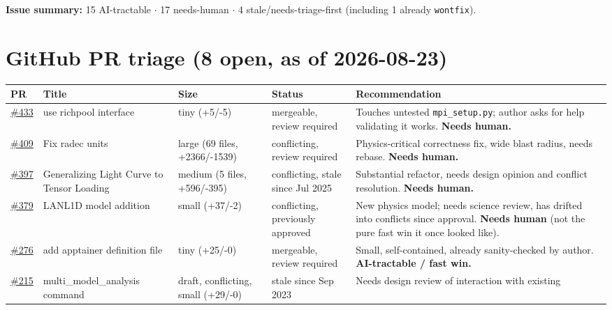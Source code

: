 \documentclass[10pt]{article}
\newcommand{\code}[1]{\texttt{#1}}
\begin{document}
\endgroup

\noindent\textbf{Issue summary:} 15 AI-tractable $\cdot$ 17 needs-human $\cdot$ 4
stale/needs-triage-first (including 1 already \code{wontfix}).

\section{GitHub PR triage (8 open, as of 2026-08-23)}

\begingroup
\small
\begin{longtable}{@{}p{1.2cm}p{3.3cm}p{2.6cm}p{2.6cm}p{4.4cm}@{}}
\toprule
\textbf{PR} & \textbf{Title} & \textbf{Size} & \textbf{Status} & \textbf{Recommendation} \\
\midrule
\endhead
\href{https://github.com/nuclear-multimessenger-astronomy/nmma/issues/433}{\#433} & use richpool interface & tiny (+5/-5) & mergeable, review required &
  Touches untested \code{mpi\_setup.py}; author asks for help validating it works.
  \textbf{Needs human.} \\[4pt]
\href{https://github.com/nuclear-multimessenger-astronomy/nmma/issues/409}{\#409} & Fix radec units & large (69 files, +2366/-1539) & conflicting, review
  required & Physics-critical correctness fix, wide blast radius, needs rebase.
  \textbf{Needs human.} \\[4pt]
\href{https://github.com/nuclear-multimessenger-astronomy/nmma/issues/397}{\#397} & Generalizing Light Curve to Tensor Loading & medium (5 files, +596/-395) &
  conflicting, stale since Jul 2025 & Substantial refactor, needs design opinion
  and conflict resolution. \textbf{Needs human.} \\[4pt]
\href{https://github.com/nuclear-multimessenger-astronomy/nmma/issues/379}{\#379} & LANL1D model addition & small (+37/-2) & conflicting, previously approved &
  New physics model; needs science review, has drifted into conflicts since
  approval. \textbf{Needs human} (not the pure fast win it once looked like). \\[4pt]
\href{https://github.com/nuclear-multimessenger-astronomy/nmma/issues/276}{\#276} & add apptainer definition file & tiny (+25/-0) & mergeable, review required &
  Small, self-contained, already sanity-checked by author. \textbf{AI-tractable /
  fast win.} \\[4pt]
\href{https://github.com/nuclear-multimessenger-astronomy/nmma/issues/215}{\#215} & multi\_model\_analysis command & draft, conflicting, small (+29/-0) &
  stale since Sep 2023 & Needs design review of interaction with existing

\end{longtable}
\end{document}
